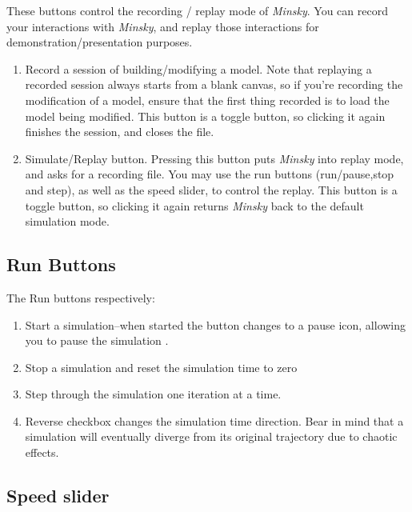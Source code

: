 These buttons control the recording / replay mode of \emph{Minsky}.
You can record your interactions with \emph{Minsky}, and replay those
interactions for demonstration/presentation purposes.
\begin{enumerate}
\item Record a session of building/modifying a model. Note that replaying
a recorded session always starts from a blank canvas, so if you're
recording the modification of a model, ensure that the first thing
recorded is to load the model being modified. This button is a toggle
button, so clicking it again finishes the session, and closes the
file. 
\item Simulate/Replay button. Pressing this button puts \emph{Minsky} into
replay mode, and asks for a recording file. You may use the run buttons
(run/pause,stop and step), as well as the speed slider, to control
the replay. This button is a toggle button, so clicking it again returns
\emph{Minsky} back to the default simulation mode. 
\end{enumerate}

\subsection{Run Buttons}

\label{RunButtons}


The Run buttons respectively: 
\begin{enumerate}
\item Start a simulation--when started the button changes to a pause icon,
allowing you to pause the simulation . 
\item Stop a simulation and reset the simulation time to zero 
\item Step through the simulation one iteration at a time. 
\item Reverse checkbox changes the simulation time direction. Bear in mind
that a simulation will eventually diverge from its original trajectory
due to chaotic effects. 
\end{enumerate}

\subsection{Speed slider}

\label{Speedslider}
\begin{center}
\par\end{center}

